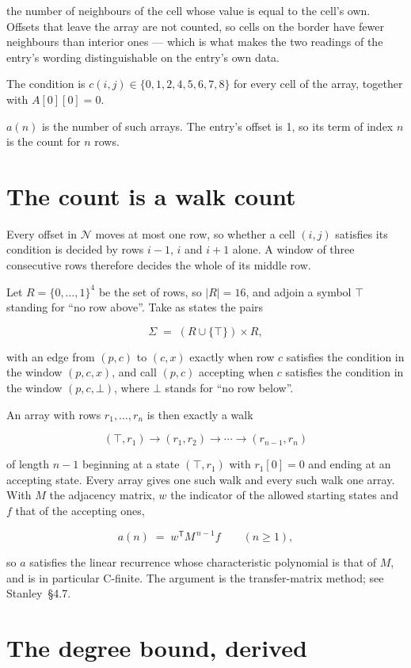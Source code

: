\documentclass[11pt]{article}
\theoremstyle{definition}
\begin{document}
the number of neighbours of the cell whose value is equal to the cell's own. Offsets that leave the array are not counted, so cells on the border have fewer neighbours than interior ones --- which is what makes the two readings of the entry's wording distinguishable on the entry's own data.

The condition is $c(i,j) \in \{0, 1, 2, 4, 5, 6, 7, 8\}$ for every cell of the array, together with $A[0][0]=0$.

$a(n)$ is the number of such arrays. The entry's offset is 1, so its term of index $n$ is the count for $n$ rows.

\section{The count is a walk count}

Every offset in $\mathcal{N}$ moves at most one row, so whether a cell $(i,j)$ satisfies its condition is decided by rows $i-1$, $i$ and $i+1$ alone. A window of three consecutive rows therefore decides the whole of its middle row.

Let $R = \{0,\dots,1\}^{4}$ be the set of rows, so $|R| = 16$, and adjoin a symbol $\top$ standing for ``no row above''. Take as states the pairs

\[\Sigma \;=\; (R \cup \{\top\}) \times R,\]

with an edge from $(p,c)$ to $(c,x)$ exactly when row $c$ satisfies the condition in the window $(p,c,x)$, and call $(p,c)$ accepting when $c$ satisfies the condition in the window $(p,c,\bot)$, where $\bot$ stands for ``no row below''.

An array with rows $r_1,\dots,r_n$ is then exactly a walk

\[(\top,r_1) \to (r_1,r_2) \to \cdots \to (r_{n-1},r_n)\]

of length $n-1$ beginning at a state $(\top,r_1)$ with $r_1[0]=0$ and ending at an accepting state. Every array gives one such walk and every such walk one array. With $M$ the adjacency matrix, $w$ the indicator of the allowed starting states and $f$ that of the accepting ones,

\[a(n) \;=\; w^{\mathsf T} M^{\,n-1} f \qquad (n \ge 1),\]

so $a$ satisfies the linear recurrence whose characteristic polynomial is that of $M$, and is in particular C-finite. The argument is the transfer-matrix method; see Stanley~\S4.7.

\section{The degree bound, derived}
\end{document}
